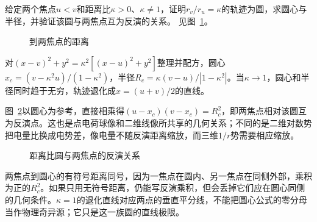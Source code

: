 \begin{exercise}[由线像电荷验证偏心边界]\label{ex:es3-h14}
给定两个焦点$u<v$和距离比$\kappa>0$、$\kappa\ne1$，证明$r_v/r_u=\kappa$的轨迹为圆，求圆心与半径，并验证该圆与两焦点互为反演的关系。 见图~\ref{fig:es3-h14-q}。
\end{exercise}

\begin{figure}[H]\centering
{}
\caption{到两焦点的距离}\label{fig:es3-h14-q}
\end{figure}
\begin{solution}
对$(x-v)^2+y^2=\kappa^2[(x-u)^2+y^2]$整理并配方，圆心$x_c=(v-\kappa^2u)/(1-\kappa^2)$，半径$R_c=\kappa(v-u)/|1-\kappa^2|$。当$\kappa\to1$，圆心和半径同时趋于无穷，轨迹退化成$x=(u+v)/2$的直线。

图~\ref{fig:es3-h14-s}以圆心为参考，直接相乘得$(u-x_c)(v-x_c)=R_c^2$，即两焦点相对该圆互为反演点。这也是点电荷球像和二维线像所共享的几何关系；不同的是二维对数势把电量比换成电势差，像电量不随反演距离缩放，而三维$1/r$势需要相应缩放。
\begin{figure}[H]\centering
{}
\caption{距离比圆与两焦点的反演关系}\label{fig:es3-h14-s}
\end{figure}


两焦点到圆心的有符号距离同号，因为一焦点在圆内、另一焦点在同侧外部，乘积为正的$R_c^2$。如果只用无符号距离，仍能写反演乘积，但会丢掉它们应在圆心同侧的几何条件。$\kappa=1$的退化直线对应两点的垂直平分线，不能把圆心公式的零分母当作物理奇异源；它只是这一族圆的直线极限。
\end{solution}
